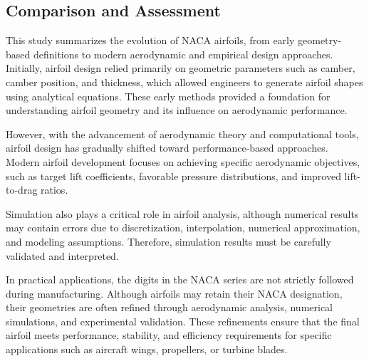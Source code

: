 \subsection*{Comparison and Assessment}

This study summarizes the evolution of NACA airfoils, 
from early geometry-based definitions to modern aerodynamic and empirical design approaches. 
Initially, airfoil design relied primarily on geometric parameters 
such as camber, camber position, and thickness, which allowed engineers to generate airfoil shapes using analytical equations. 
These early methods provided a foundation for understanding airfoil geometry and its influence on aerodynamic performance.

However, 
with the advancement of aerodynamic theory and computational tools, airfoil design has gradually shifted toward performance-based approaches. 
Modern airfoil development focuses on achieving specific aerodynamic objectives, 
such as target lift coefficients, favorable pressure distributions, and improved lift-to-drag ratios.

Simulation also plays a critical role in airfoil analysis, 
although numerical results may contain errors due to discretization, interpolation, numerical approximation, and modeling assumptions. 
Therefore, simulation results must be carefully validated and interpreted.

In practical applications, 
the digits in the NACA series are not strictly followed during manufacturing. Although airfoils may retain their NACA designation, 
their geometries are often refined through aerodynamic analysis, numerical simulations, and experimental validation. 
These refinements ensure that the final airfoil meets performance, stability, and efficiency requirements for specific applications such as aircraft wings, propellers, or turbine blades.
